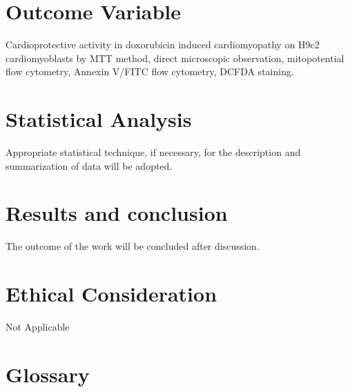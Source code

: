 \documentclass[11pt]{report} %
\begin{document}
\section{Outcome Variable}
\label{sec:Outcome Variable}

Cardioprotective activity in doxorubicin induced cardiomyopathy on H9c2 cardiomyoblasts by MTT method, direct microscopic observation, mitopotential flow cytometry, Annexin V/FITC flow cytometry, DCFDA staining.


\section{Statistical Analysis}
\label{sec:Statistical Analysis}

Appropriate statistical technique, if necessary, for the description and summarization of data will be adopted.

\section{Results and conclusion}
\label{sec:Results and conclusion}

The outcome of the work will be concluded after discussion.

\section{Ethical Consideration}
\label{Sec:ethical}

Not Applicable





\section{Glossary}
\label{sec: Glossary}
\end{document}
